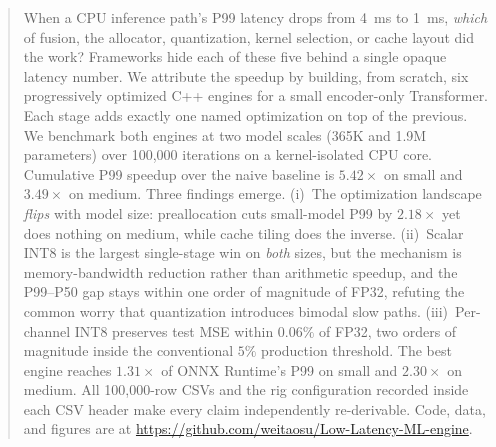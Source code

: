 \documentclass{article}
\begin{document}

\printAffiliationsAndNotice{}

\begin{abstract}
When a CPU inference path's P99 latency drops from 4~ms to 1~ms, \emph{which} of fusion, the allocator, quantization, kernel selection, or cache layout did the work?
Frameworks hide each of these five behind a single opaque latency number.
We attribute the speedup by building, from scratch, six progressively optimized C++ engines for a small encoder-only Transformer. Each stage adds exactly one named optimization on top of the previous. We benchmark both engines at two model scales (365K and 1.9M parameters) over 100{,}000 iterations on a kernel-isolated CPU core.
Cumulative P99 speedup over the naive baseline is $\mathbf{5.42\times}$ on small and $\mathbf{3.49\times}$ on medium.
Three findings emerge.
(i)~The optimization landscape \emph{flips} with model size: preallocation cuts small-model P99 by $2.18\times$ yet does nothing on medium, while cache tiling does the inverse.
(ii)~Scalar INT8 is the largest single-stage win on \emph{both} sizes, but the mechanism is memory-bandwidth reduction rather than arithmetic speedup, and the P99--P50 gap stays within one order of magnitude of FP32, refuting the common worry that quantization introduces bimodal slow paths.
(iii)~Per-channel INT8 preserves test MSE within $0.06\%$ of FP32, two orders of magnitude inside the conventional $5\%$ production threshold.
The best engine reaches $1.31\times$ of ONNX Runtime's P99 on small and $2.30\times$ on medium.
All 100{,}000-row CSVs and the rig configuration recorded inside each CSV header make every claim independently re-derivable. Code, data, and figures are at \url{https://github.com/weitaosu/Low-Latency-ML-engine}.
\end{abstract}
\end{document}
